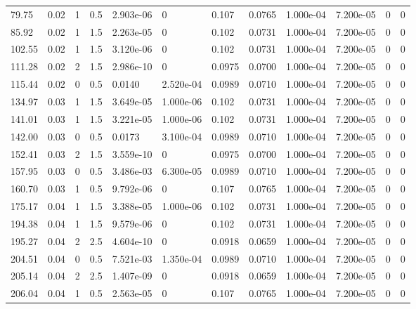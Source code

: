 \documentclass[preview]{standalone}
\begin{document}
{{\begin{tabular}{L{1.2cm}C{1.2cm} C{0.3cm}C{0.5cm} C{1.4cm}C{1.4cm} C{1.4cm}C{1.4cm} C{1.6cm}C{1.6cm} C{1.6cm}C{1.6cm}}
  79.75  &  0.02  & 1     & 0.5 &  2.903e-06  & 0  &  0.107&   0.0765& 1.000e-04 & 7.200e-05   &  0 & 0  \\ 
  85.92  &  0.02  & 1     & 1.5 &  2.263e-05  & 0  &  0.102&   0.0731& 1.000e-04 & 7.200e-05   &  0 & 0  \\ 
  102.55  &  0.02  & 1     & 1.5 &  3.120e-06  & 0  &  0.102&   0.0731& 1.000e-04 & 7.200e-05   &  0 & 0  \\ 
  111.28  &  0.02  & 2     & 1.5 &  2.986e-10  & 0  &  0.0975&   0.0700& 1.000e-04 & 7.200e-05   &  0 & 0  \\ 
  115.44  &  0.02  & 0     & 0.5 &  0.0140  & 2.520e-04  &  0.0989&   0.0710& 1.000e-04 & 7.200e-05   &  0 & 0  \\ 
  134.97  &  0.03  & 1     & 1.5 &  3.649e-05  & 1.000e-06  &  0.102&   0.0731& 1.000e-04 & 7.200e-05   &  0 & 0  \\ 
  141.01  &  0.03  & 1     & 1.5 &  3.221e-05  & 1.000e-06  &  0.102&   0.0731& 1.000e-04 & 7.200e-05   &  0 & 0  \\ 
  142.00  &  0.03  & 0     & 0.5 &  0.0173  & 3.100e-04  &  0.0989&   0.0710& 1.000e-04 & 7.200e-05   &  0 & 0  \\ 
  152.41  &  0.03  & 2     & 1.5 &  3.559e-10  & 0  &  0.0975&   0.0700& 1.000e-04 & 7.200e-05   &  0 & 0  \\ 
  157.95  &  0.03  & 0     & 0.5 &  3.486e-03  & 6.300e-05  &  0.0989&   0.0710& 1.000e-04 & 7.200e-05   &  0 & 0  \\ 
  160.70  &  0.03  & 1     & 0.5 &  9.792e-06  & 0  &  0.107&   0.0765& 1.000e-04 & 7.200e-05   &  0 & 0  \\ 
  175.17  &  0.04  & 1     & 1.5 &  3.388e-05  & 1.000e-06  &  0.102&   0.0731& 1.000e-04 & 7.200e-05   &  0 & 0  \\ 
  194.38  &  0.04  & 1     & 1.5 &  9.579e-06  & 0  &  0.102&   0.0731& 1.000e-04 & 7.200e-05   &  0 & 0  \\ 
  195.27  &  0.04  & 2     & 2.5 &  4.604e-10  & 0  &  0.0918&   0.0659& 1.000e-04 & 7.200e-05   &  0 & 0  \\ 
  204.51  &  0.04  & 0     & 0.5 &  7.521e-03  & 1.350e-04  &  0.0989&   0.0710& 1.000e-04 & 7.200e-05   &  0 & 0  \\ 
  205.14  &  0.04  & 2     & 2.5 &  1.407e-09  & 0  &  0.0918&   0.0659& 1.000e-04 & 7.200e-05   &  0 & 0  \\ 
  206.04  &  0.04  & 1     & 0.5 &  2.563e-05  & 0  &  0.107&   0.0765& 1.000e-04 & 7.200e-05   &  0 & 0  \\ 

\end{tabular}}}
\end{document}
